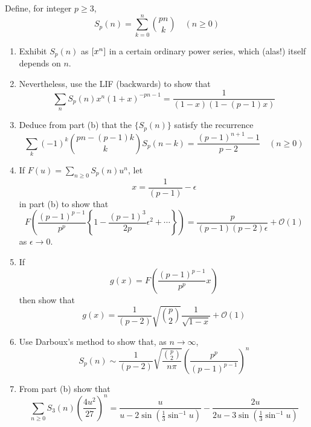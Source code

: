 \begin{exercise}
    Define, for integer $p\geq 3$,
    \[
        S_p(n) = \sum_{k=0}^n \binom{pn}{k} \quad (n\geq 0)
    \]
    \begin{enumerate}[label=(\alph*)]
        \item Exhibit $S_p(n)$ as $\left[x^n\right]$ in a certain ordinary power series, which (alas!) itself depends on $n$.
        \item Nevertheless, use the LIF (backwards) to show that 
        \[
            \sum_n S_p(n) x^n (1+x)^{-pn-1} = \frac{1}{(1-x)(1-(p-1)x)}
        \]
        \item Deduce from part (b) that the $\{S_p(n)\}$ satisfy the recurrence 
        \[
            \sum_k (-1)^k \binom{pn-(p-1)k}{k} S_p(n-k) = \frac{(p-1)^{n+1} - 1}{p-2} \quad (n\geq 0)
        \]
        \item If $F(u) = \sum_{n\geq 0}S_p(n)u^n$, let
        \[
            x= \frac{1}{(p-1)} - \epsilon
        \]
        in part (b) to show that 
        \[
            F\left(\frac{(p-1)^{p-1}}{p^p}\left\{1- \frac{(p-1)^3}{2p}\epsilon^2 + \cdots\right\}\right) = \frac{p}{(p-1)(p-2)\epsilon} + \mathcal{O}(1)
        \]
        as $\epsilon\to0$.
        \item If 
        \[
            g(x) = F\left(\frac{(p-1)^{p-1}}{p^p}x\right)
        \]
        then show that 
        \[
            g(x) = \frac{1}{(p-2)}\sqrt{\binom{p}{2}}\frac{1}{\sqrt{1-x}} + \mathcal{O}(1)
        \]
        \item Use Darboux's method to show that, as $n\to \infty$,
        \[
            S_p(n) \sim \frac{1}{(p-2)} \sqrt{\frac{\binom{p}{2}}{n\pi}} \left(\frac{p^p}{(p-1)^{p-1}}\right)^n
        \]
        \item From part (b) show that 
        \[
            \sum_{n\geq0} S_3(n)\left(\frac{4u^2}{27}\right)^n = \frac{u}{u-2\sin\left(\frac{1}{3}\sin^{-1} u\right)} - \frac{2u}{2u-3\sin\left(\frac{1}{3}\sin^{-1} u\right)}
        \]
    \end{enumerate}
\end{exercise}

